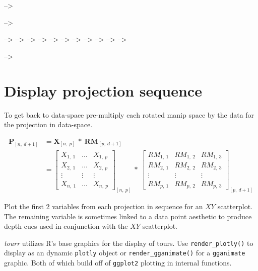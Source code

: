 \documentclass{monashthesis}
\begin{document}
--\textgreater{}

--\textgreater{}

--\textgreater{} --\textgreater{} --\textgreater{} --\textgreater{}
--\textgreater{} --\textgreater{} --\textgreater{} --\textgreater{}
--\textgreater{} --\textgreater{} --\textgreater{}

--\textgreater{}

\section{Display projection sequence}\label{sec:display}

To get back to data-space pre-multiply each rotated manip space by the
data for the projection in data-space.

\begin{align}
  \textbf{P}_{[n,~d+1]}
    &= \textbf{X}_{[n,~p]} ~*~ \textbf{RM}_{[p,~d+1]} \\
    &=
      \begin{bmatrix}
          X_{1,~1} & \dots & X_{1,~p} \\
          X_{2,~1} & \dots & X_{2,~p} \\
          \vdots   & \vdots & \vdots  \\
          X_{n,~1} & \dots & X_{n,~p}
      \end{bmatrix}_{[n,~p]}
      ~*~
      \begin{bmatrix}
        RM_{1,~1} & RM_{1,~2} & RM_{1,~3} \\
        RM_{2,~1} & RM_{2,~2} & RM_{2,~3} \\
        \vdots     & \vdots     & \vdots     \\
        RM_{p,~1} & RM_{p,~2} & RM_{p,~3}
      \end{bmatrix}_{[p,~d+1]}
\end{align}

Plot the first 2 variables from each projection in sequence for an
\(XY\) scatterplot. The remaining variable is sometimes linked to a data
point aesthetic to produce depth cues used in conjunction with the
\(XY\) scatterplot.

\emph{tourr} utilizes R's base graphics for the display of tours. Use
\texttt{render\_plotly()} to display as an dynamic \texttt{plotly}
\textcite{sievert_plotly_2018} object or \texttt{render\_gganimate()}
for a \texttt{gganimate} \textcite{pedersen_gganimate:_2019} graphic.
Both of which build off of \texttt{ggplot2} plotting in internal
functions.
\end{document}
